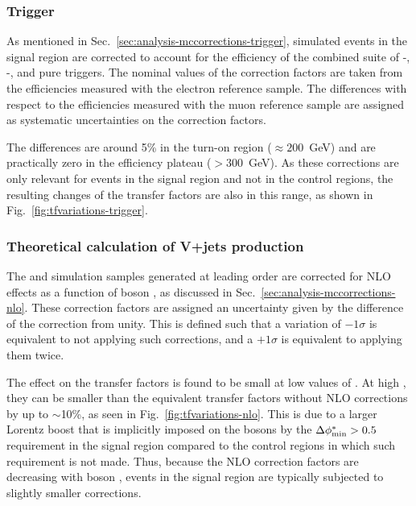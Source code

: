 \subsubsection{Trigger}
As mentioned in Sec.~\ref{sec:analysis-mccorrections-trigger}, simulated events 
in the signal region are corrected to account for the efficiency of the 
combined suite of \scalht-\alphat, \met-\mht, and pure \scalht triggers. The 
nominal values of the correction factors are taken from the efficiencies 
measured with the electron reference sample. The differences with respect to 
the efficiencies measured with the muon reference sample are assigned as 
systematic uncertainties on the correction factors. 

The differences are around 
5\% in the turn-on region (\mht$\approx200$~GeV) and are practically zero in 
the efficiency plateau (\mht$>300$~GeV). 
As these corrections are only relevant for events in the signal region and not 
in the control regions, the resulting changes of the transfer factors are also 
in this range, as shown in Fig.~\ref{fig:tfvariations-trigger}. 

\subsubsection{Theoretical calculation of V+jets production}
The \zj and \wj simulation samples generated at leading order are corrected for 
NLO effects as a function of boson \pt, as discussed in 
Sec.~\ref{sec:analysis-mccorrections-nlo}.
These correction factors are assigned an uncertainty given by 
the difference of the correction from unity.
This is defined such that a variation of $-1\sigma$ 
is equivalent to not applying such corrections, and a $+1\sigma$ is equivalent 
to applying them twice.

The effect on the transfer factors is found to be small at low values of 
\scalht. At high \scalht, they can be smaller than the equivalent transfer 
factors without NLO corrections by up to $\sim$10\%, as seen in 
Fig.~\ref{fig:tfvariations-nlo}.
This is due to a larger Lorentz boost that is implicitly imposed 
on the bosons by the $\mbox{$\Delta\phi^{*}_{\mathrm{min}}$}>0.5$ requirement in the signal region compared to 
the control regions in which such requirement is not made. Thus, because the 
NLO correction factors are decreasing with boson \pt, events in the 
signal region are typically subjected to slightly smaller corrections.

